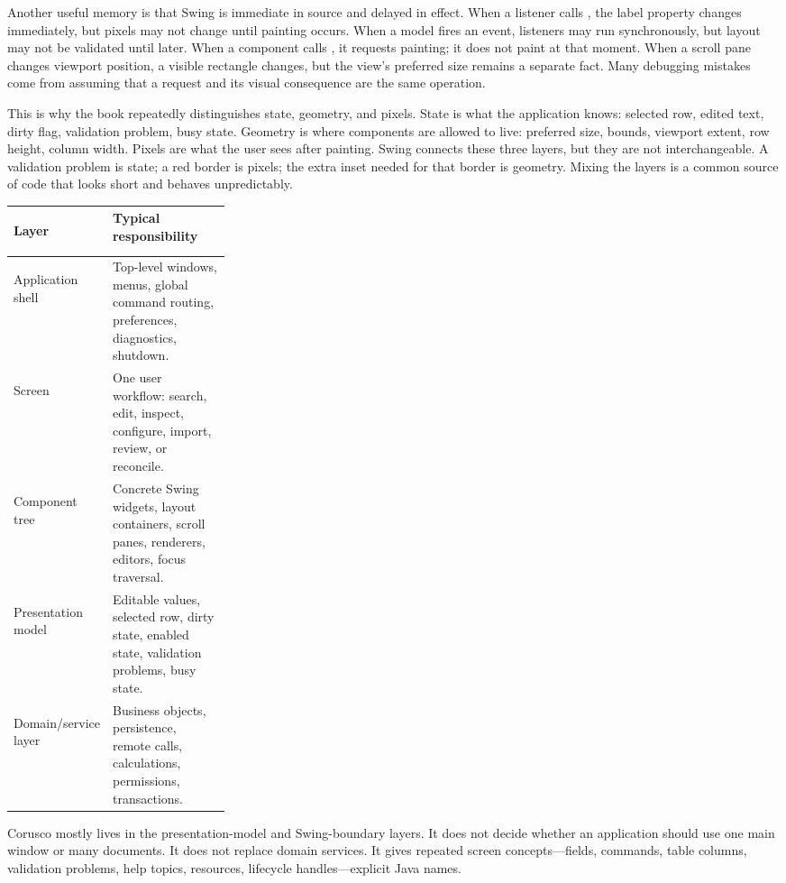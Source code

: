 Another useful memory is that Swing is immediate in source and delayed in
effect. When a listener calls , the label property changes
immediately, but pixels may not change until painting occurs. When a model fires
an event, listeners may run synchronously, but layout may not be validated until
later. When a component calls , it requests painting; it does not
paint at that moment. When a scroll pane changes viewport position, a visible
rectangle changes, but the view's preferred size remains a separate fact. Many
debugging mistakes come from assuming that a request and its visual consequence
are the same operation.

This is why the book repeatedly distinguishes state, geometry, and pixels.
State is what the application knows: selected row, edited text, dirty flag,
validation problem, busy state. Geometry is where components are allowed to
live: preferred size, bounds, viewport extent, row height, column width. Pixels
are what the user sees after painting. Swing connects these three layers, but
they are not interchangeable. A validation problem is state; a red border is
pixels; the extra inset needed for that border is geometry. Mixing the layers
is a common source of code that looks short and behaves unpredictably.

\begin{center}\small
\begin{tabularx}{0.94\linewidth}{>{\bfseries\raggedright\arraybackslash}p{0.28\linewidth}X}
\toprule
Layer & Typical responsibility\\
\midrule
Application shell & Top-level windows, menus, global command routing, preferences, diagnostics, shutdown.\\
Screen & One user workflow: search, edit, inspect, configure, import, review, or reconcile.\\
Component tree & Concrete Swing widgets, layout containers, scroll panes, renderers, editors, focus traversal.\\
Presentation model & Editable values, selected row, dirty state, enabled state, validation problems, busy state.\\
Domain/service layer & Business objects, persistence, remote calls, calculations, permissions, transactions.\\
\bottomrule
\end{tabularx}
\end{center}

Corusco mostly lives in the presentation-model and Swing-boundary layers. It does not decide whether an application should use one main window or many documents. It does not replace domain services. It gives repeated screen concepts---fields, commands, table columns, validation problems, help topics, resources, lifecycle handles---explicit Java names.


